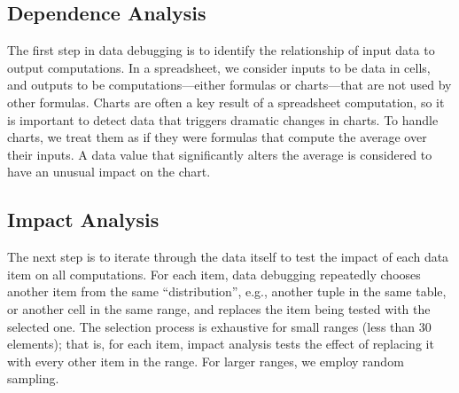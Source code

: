 
\subsection{Dependence Analysis}

The first step in data debugging is to identify the relationship of
input data to output computations.
In a spreadsheet, we consider inputs to be data in cells, and outputs to be computations---either formulas or charts---that are not used by other formulas.
Charts are often a key result of a spreadsheet computation, so it
is important to detect data that triggers dramatic changes in
charts. To handle charts, we treat them as if they were
formulas that compute the average over their inputs. A data value that
significantly alters the average is considered to have an
unusual impact on the chart.





\subsection{Impact Analysis}

The next step is to iterate through the data itself to test the impact of each
data item on all computations. For each item, data debugging repeatedly
chooses another item from the same ``distribution'', e.g., another tuple in
the same table, or another cell in the same range, and replaces the item being
tested with the selected one. The selection process is exhaustive for small
ranges (less than 30 elements); that is, for each item, impact analysis tests
the effect of replacing it with every other item in the range. For larger
ranges, we employ random sampling.

